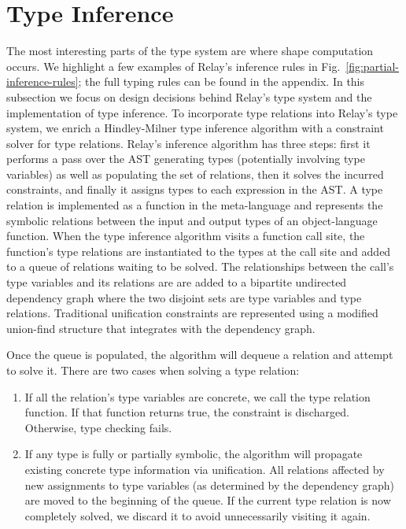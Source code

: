 \section{Type Inference}
\label{sec:inference}

The most interesting parts of the type system
are where shape computation occurs.
We highlight a few examples of Relay's inference
rules in Fig.~\ref{fig:partial-inference-rules};
the full typing rules can be found in the appendix.
In this subsection we focus on design decisions behind Relay's type system
and the implementation of type inference.
To incorporate type relations into Relay's type system, we enrich
a Hindley-Milner type inference algorithm with
a constraint solver for type relations.
Relay's inference algorithm has three steps: first it
performs a pass over the AST generating types (potentially involving type variables)
as well as populating the set of relations,
then it solves the incurred constraints,
and finally it assigns types to each expression in the AST.
A type relation is implemented as a function in the
meta-language and represents the symbolic relations between
the input and output types of an object-language function.
When the type inference algorithm visits a function call site, the function's type relations are
instantiated to the types at the call site and added to a queue of relations waiting to be
solved.
The relationships between the call's type variables and its relations are are added to a
bipartite undirected dependency graph where the two disjoint sets are type variables and type relations.
Traditional unification constraints are represented using a modified union-find structure that
integrates with the dependency graph.

Once the queue is populated, the algorithm will dequeue a relation and attempt to solve it.
There are two cases when solving a type relation:
\begin{enumerate}
\item If all the relation's type variables
are concrete, we call the type relation function. If that function returns true, the
constraint is discharged. Otherwise, type checking fails.
\item If any type is fully or partially symbolic, the
  algorithm will propagate
  existing concrete type information via unification.
All relations affected by new assignments to type
  variables (as determined by the dependency graph)
  are moved to the beginning of the queue.
If the current type relation is now completely solved, we
discard it to avoid unnecessarily visiting it again.
\end{enumerate}

